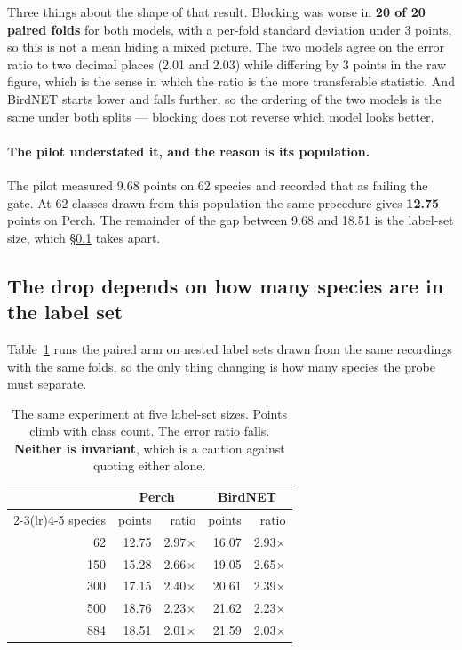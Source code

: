 \documentclass[10pt,twocolumn,a4paper]{article}
\begin{document}
Three things about the shape of that result. Blocking was worse in \textbf{20 of 20 paired
folds} for both models, with a per-fold standard deviation under 3 points, so this is not a
mean hiding a mixed picture. The two models agree on the error ratio to two decimal places
(2.01 and 2.03) while differing by 3 points in the raw figure, which is the sense in which the
ratio is the more transferable statistic. And BirdNET starts lower and falls further, so the
ordering of the two models is the same under both splits --- blocking does not reverse which
model looks better.

\paragraph{The pilot understated it, and the reason is its population.} The pilot measured 9.68
points on 62 species and recorded that as failing the gate. At 62 classes drawn from this
population the same procedure gives \textbf{12.75} points on Perch. The remainder of the gap
between 9.68 and 18.51 is the label-set size, which \S\ref{sec:sweep} takes apart.

\subsection{The drop depends on how many species are in the label set}
\label{sec:sweep}

Table~\ref{tab:sweep} runs the paired arm on nested label sets drawn from the same recordings
with the same folds, so the only thing changing is how many species the probe must separate.

\begin{table}[t]
\footnotesize
\setlength{\tabcolsep}{5pt}
\caption{The same experiment at five label-set sizes. Points climb with class count. The error
ratio falls. \textbf{Neither is invariant}, which is a caution against quoting either alone.}
\label{tab:sweep}
\begin{tabular}{r rr rr}
\toprule
 & \multicolumn{2}{c}{Perch} & \multicolumn{2}{c}{BirdNET} \\
\cmidrule(lr){2-3}\cmidrule(lr){4-5}
species & points & ratio & points & ratio \\
\midrule
62  & 12.75 & 2.97$\times$ & 16.07 & 2.93$\times$ \\
150 & 15.28 & 2.66$\times$ & 19.05 & 2.65$\times$ \\
300 & 17.15 & 2.40$\times$ & 20.61 & 2.39$\times$ \\
500 & 18.76 & 2.23$\times$ & 21.62 & 2.23$\times$ \\
884 & 18.51 & 2.01$\times$ & 21.59 & 2.03$\times$ \\
\bottomrule
\end{tabular}
\end{table}
\end{document}
